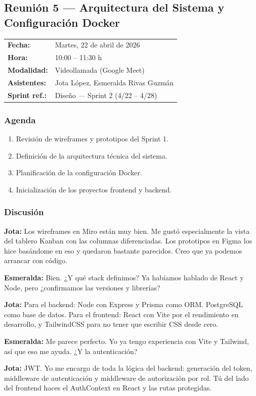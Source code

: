 \documentclass[12pt, a4paper]{article}
\makeatletter
\newcommand{\actaheader}[5]{%
  \begin{mdframed}[
    backgroundcolor=sectionbg,
    linecolor=bordercolor,
    linewidth=1pt,
    innerleftmargin=12pt, innerrightmargin=12pt,
    innertopmargin=10pt, innerbottommargin=10pt,
    skipabove=8pt, skipbelow=8pt
  ]
  \begin{tabularx}{\linewidth}{@{}lX@{}}
    \textbf{Fecha:}       & #1 \\[2pt]
    \textbf{Hora:}        & #2 \\[2pt]
    \textbf{Modalidad:}   & #3 \\[2pt]
    \textbf{Asistentes:}  & #4 \\[2pt]
    \textbf{Sprint ref.:} & #5 \\
  \end{tabularx}
  \end{mdframed}%
}
\newcommand{\jota}[1]{\noindent\textbf{\color{primary}Jota:} #1\par\smallskip}
\newcommand{\esme}[1]{\noindent\textbf{\color{accentgreen}Esmeralda:} #1\par\smallskip}
\makeatother
\begin{document}
\subsection{Reunión 5 — Arquitectura del Sistema y Configuración Docker}
\actaheader
  {Martes, 22 de abril de 2026}
  {10:00 -- 11:30 h}
  {Videollamada (Google Meet)}
  {Jota López, Esmeralda Rivas Guzmán}
  {Diseño — Sprint 2 (4/22 -- 4/28)}

\subsubsection*{Agenda}
\begin{enumerate}[leftmargin=1.5em]
  \item Revisión de wireframes y prototipos del Sprint 1.
  \item Definición de la arquitectura técnica del sistema.
  \item Planificación de la configuración Docker.
  \item Inicialización de los proyectos frontend y backend.
\end{enumerate}

\subsubsection*{Discusión}

\jota{Los wireframes en Miro están muy bien. Me gustó especialmente la vista del tablero Kanban con las columnas diferenciadas. Los prototipos en Figma los hice basándome en eso y quedaron bastante parecidos. Creo que ya podemos arrancar con código.}

\esme{Bien. ¿Y qué stack definimos? Ya habíamos hablado de React y Node, pero ¿confirmamos las versiones y librerías?}

\jota{Para el backend: Node con Express y Prisma como ORM. PostgreSQL como base de datos. Para el frontend: React con Vite por el rendimiento en desarrollo, y TailwindCSS para no tener que escribir CSS desde cero.}

\esme{Me parece perfecto. Yo ya tengo experiencia con Vite y Tailwind, así que eso me ayuda. ¿Y la autenticación?}

\jota{JWT. Yo me encargo de toda la lógica del backend: generación del token, middleware de autenticación y middleware de autorización por rol. Tú del lado del frontend haces el AuthContext en React y las rutas protegidas.}
\end{document}
